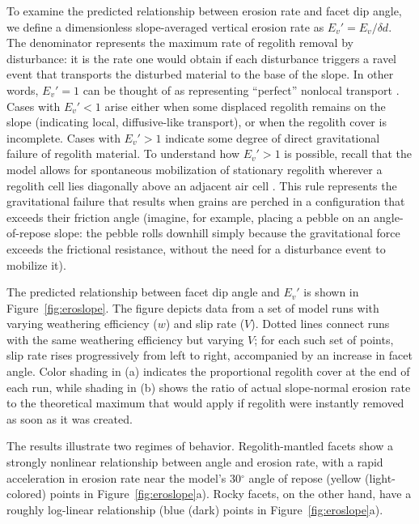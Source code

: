 To examine the predicted relationship between erosion rate and facet dip angle, we define a dimensionless slope-averaged vertical erosion rate as $E_v' = E_v / \delta d$. The denominator represents the maximum rate of regolith removal by disturbance: it is the rate one would obtain if each disturbance triggers a ravel event that transports the disturbed material to the base of the slope. In other words, $E_v' = 1$ can be thought of as representing ``perfect'' nonlocal transport \citep[e.g.,][]{tucker2010trouble,dibiase2017slope,doane2018nonlocal}. Cases with $E_v'<1$ arise either when some displaced regolith remains on the slope (indicating local, diffusive-like transport), or when the regolith cover is incomplete. Cases with $E_v'>1$ indicate some degree of direct gravitational failure of regolith material. To understand how $E_v'>1$ is possible, recall that the model allows for spontaneous mobilization of stationary regolith wherever a regolith cell lies diagonally above an adjacent air cell \citep[][their Figures 14 and 15]{tucker2016celllab}. This rule represents the gravitational failure that results when grains are perched in a configuration that exceeds their friction angle (imagine, for example, placing a pebble on an angle-of-repose slope: the pebble rolls downhill simply because the gravitational force exceeds the frictional resistance, without the need for a disturbance event to mobilize it).

The predicted relationship between facet dip angle and $E_v'$ is shown in Figure~\ref{fig:eroslope}.  The figure depicts data from a set of model runs with varying weathering efficiency ($w$) and slip rate ($V$). Dotted lines connect runs with the same weathering efficiency but varying $V$; %
for each such set of points, slip rate rises progressively from left to right, accompanied by an increase in facet angle. Color shading in (a) indicates the proportional regolith cover at the end of each run, while shading in (b) shows the ratio of actual slope-normal erosion rate to the theoretical maximum that would apply if regolith were instantly removed as soon as it was created. 

The results illustrate two regimes of behavior. Regolith-mantled facets show a strongly nonlinear relationship between angle and erosion rate, with a rapid acceleration in erosion rate near the model's 30$^\circ$ angle of repose (yellow (light-colored) points in Figure~\ref{fig:eroslope}a). Rocky facets, on the other hand, have a roughly log-linear relationship (blue (dark) points in Figure~\ref{fig:eroslope}a).

